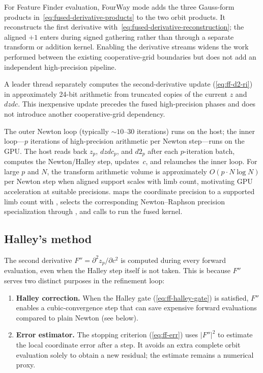 For Feature Finder evaluation, FourWay mode adds the three Gauss-form products
in~\eqref{eq:fused-derivative-products} to the two orbit products.  It reconstructs
the first derivative with~\eqref{eq:fused-derivative-reconstruction}; the aligned
$+1$ enters during signed gathering rather than through a separate transform or
addition kernel.  Enabling the derivative streams widens the work performed
between the existing cooperative-grid boundaries but does not add an independent
high-precision pipeline.

A leader thread separately computes the second-derivative update
(\cref{eq:ff-d2-ri}) in approximately 24-bit  arithmetic from
truncated copies of the current $z$ and $\mathit{dzdc}$.  This inexpensive
update precedes the fused high-precision phases and does not introduce another
cooperative-grid dependency.

\medskip
\noindent
The outer Newton loop (typically ${\sim}10$--$30$ iterations) runs on
the host; the inner loop---$p$ iterations of high-precision
arithmetic per Newton step---runs on the GPU.  The host reads back
$z_p$, $\mathit{dzdc}_p$, and $d2_p$ after each $p$-iteration batch,
computes the Newton/Halley step, updates~$c$, and relaunches the inner
loop.  For large $p$ and $N$, the transform arithmetic volume is approximately
$O(p \cdot N \log N)$ per Newton step when aligned support scales with
limb count, motivating GPU acceleration at suitable precisions.   maps the coordinate
precision to a supported limb count with ,
selects the corresponding Newton--Raphson precision specialization through
, and calls
 to run the fused kernel.

\subsection{Halley's method}
\label{subsec:ff-halley}

The second derivative $F'' = \partial^2 z_p/\partial c^2$ is computed during
every forward evaluation, even when the Halley step itself is not taken.  This
is because $F''$ serves two distinct purposes in the refinement loop:

\begin{enumerate}
\item \textbf{Halley correction.}  When the Halley gate (\cref{eq:ff-halley-gate})
  is satisfied, $F''$ enables a cubic-convergence step that can save expensive
  forward evaluations compared to plain Newton (see below).
\item \textbf{Error estimator.}  The stopping criterion
  (\cref{eq:ff-err}) uses $|F''|^2$ to estimate the local coordinate error
  after a step.  It avoids an extra complete orbit evaluation solely to
  obtain a new residual; the estimate remains a numerical proxy.
\end{enumerate}

